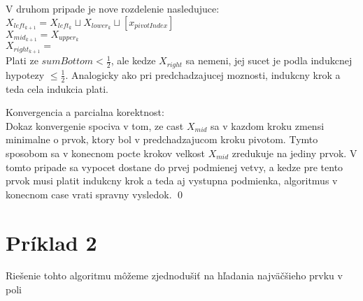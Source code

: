 \documentclass[paper=a4, fontsize=11pt]{scrartcl} %
\numberwithin{equation}{section} %
\numberwithin{figure}{section} %
\numberwithin{table}{section} %
\begin{document}
V druhom pripade je nove rozdelenie nasledujuce: \\
$X_{left_{k+1}} = X_{left_k} \sqcup  X_{lower_k} \sqcup [x_{pivotIndex}]$ \\
$X_{mid_{k+1}} = X_{upper_k}$ \\
$X_{right_{k+1}} = $ \\
Plati ze $sumBottom < \frac{1}{2}$, ale kedze $X_{right}$ sa nemeni, jej sucet je podla indukcnej hypotezy $\leq \frac{1}{2}$.
Analogicky ako pri predchadzajucej moznosti, indukcny krok a teda cela indukcia plati.

Konvergencia a parcialna korektnost: \\

Dokaz konvergenie spociva v tom, ze cast $X_{mid}$ sa v kazdom kroku zmensi minimalne o prvok, ktory bol v predchadzajucom kroku pivotom. Tymto sposobom sa v konecnom pocte krokov velkost $X_{mid}$ zredukuje na jediny prvok. V tomto pripade sa vypocet dostane do prvej podmienej vetvy, a kedze pre tento prvok musi platit indukcny krok a teda aj vystupna podmienka, algoritmus v konecnom case vrati spravny vysledok. \qed

\pagebreak

\section*{Príklad 2}

Riešenie tohto algoritmu môžeme zjednodušiť na hľadania najväčšieho prvku v poli

\newcommand{\pushcode}[1][1]{\hskip\dimexpr#1\algorithmicindent\relax}

\algnewcommand{}
\algnewcommand{}
\end{document}
